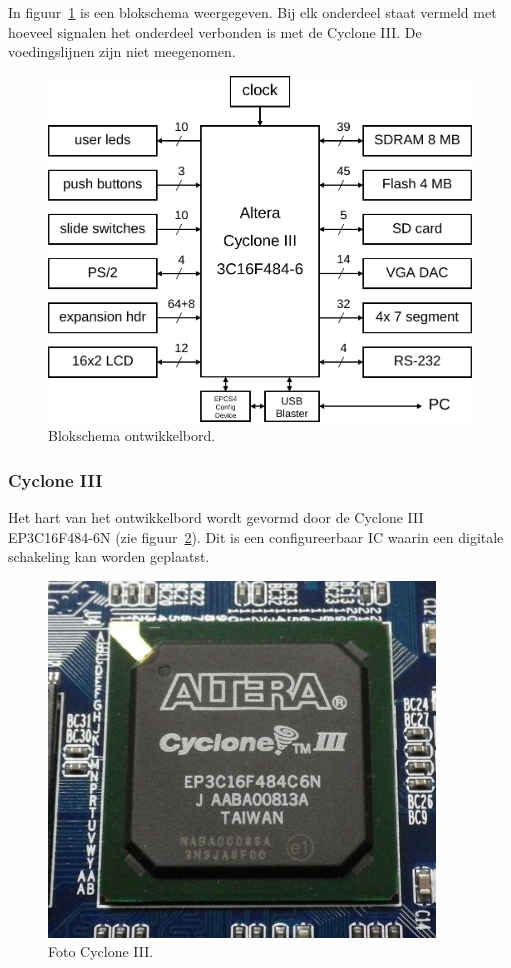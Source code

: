 \documentclass[a4paper,12pt,fleqn,twoside]{book}
\begin{document}
In figuur~\ref{fig:010blockdiagram} is een blokschema weergegeven. Bij elk
onderdeel staat vermeld met hoeveel signalen het onderdeel verbonden is met de
Cyclone III. De voedingslijnen zijn niet meegenomen. 

\begin{figure}[H]
\centering
\includegraphics[scale=0.50]{010blockdiagram.pdf}
\caption{Blokschema ontwikkelbord.}
\label{fig:010blockdiagram}
\end{figure}

\subsubsection{Cyclone III}
Het hart van het ontwikkelbord wordt gevormd door de Cyclone III EP3C16F484-6N
(zie figuur~\ref{fig:ep3c16f484c6n}). Dit is een configureerbaar IC waarin een
digitale schakeling kan worden geplaatst.

\begin{figure}[H]
\centering
\includegraphics[scale=0.40]{ep3c16f484c6n.jpg}
\caption{Foto Cyclone III.}
\label{fig:ep3c16f484c6n}
\end{figure}
\end{document}
